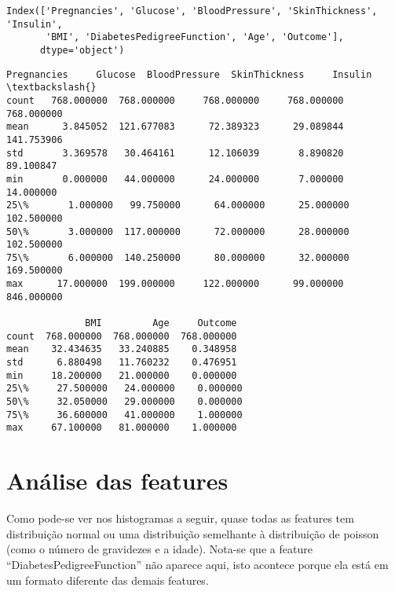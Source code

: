 \documentclass[11pt]{article}
\makeatletter
\newcommand{\boxspacing}{\kern\kvtcb@left@rule\kern\kvtcb@boxsep}
\newcommand{\prompt}[4]{
        {\ttfamily\llap{{\color{#2}[#3]:\hspace{3pt}#4}}\vspace{-\baselineskip}}
    }
\makeatother
\begin{document}
    \begin{Verbatim}[commandchars=\\\{\}]
Index(['Pregnancies', 'Glucose', 'BloodPressure', 'SkinThickness', 'Insulin',
       'BMI', 'DiabetesPedigreeFunction', 'Age', 'Outcome'],
      dtype='object')
    \end{Verbatim}

            \begin{tcolorbox}[breakable, size=fbox, boxrule=.5pt, pad at break*=1mm, opacityfill=0]
\prompt{Out}{outcolor}{3}{\boxspacing}
\begin{Verbatim}[commandchars=\\\{\}]
       Pregnancies     Glucose  BloodPressure  SkinThickness     Insulin  \textbackslash{}
count   768.000000  768.000000     768.000000     768.000000  768.000000
mean      3.845052  121.677083      72.389323      29.089844  141.753906
std       3.369578   30.464161      12.106039       8.890820   89.100847
min       0.000000   44.000000      24.000000       7.000000   14.000000
25\%       1.000000   99.750000      64.000000      25.000000  102.500000
50\%       3.000000  117.000000      72.000000      28.000000  102.500000
75\%       6.000000  140.250000      80.000000      32.000000  169.500000
max      17.000000  199.000000     122.000000      99.000000  846.000000

              BMI         Age     Outcome
count  768.000000  768.000000  768.000000
mean    32.434635   33.240885    0.348958
std      6.880498   11.760232    0.476951
min     18.200000   21.000000    0.000000
25\%     27.500000   24.000000    0.000000
50\%     32.050000   29.000000    0.000000
75\%     36.600000   41.000000    1.000000
max     67.100000   81.000000    1.000000
\end{Verbatim}
\end{tcolorbox}
        
    \hypertarget{anuxe1lise-das-features}{%
\section{Análise das features}\label{anuxe1lise-das-features}}

Como pode-se ver nos histogramas a seguir, quase todas as features tem
distribuição normal ou uma distribuição semelhante à distribuição de
poisson (como o número de gravidezes e a idade). Nota-se que a feature
``DiabetesPedigreeFunction'' não aparece aqui, isto acontece porque ela
está em um formato diferente das demais features.
\end{document}

